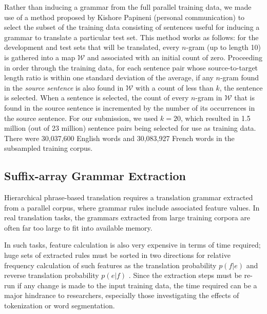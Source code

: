 \documentclass[11pt]{article}
\newcommand{\ignore}[1]{}
\begin{document}
Rather than inducing a grammar from the full parallel training data, we made use of a method proposed by Kishore Papineni (personal communication) to select the subset of the training data consisting of  sentences useful for inducing a grammar to translate a particular test set.  This method works as follows: for the development and test sets that will be translated, every $n$-gram (up to length 10) is gathered into a map $\mathcal{W}$ and associated with an initial count of zero.  Proceeding in order through the training data, for each sentence pair whose source-to-target length ratio is within one standard deviation of the average, if any $n$-gram found in the \emph{source sentence} is also found in $\mathcal{W}$ with a count of less than $k$, the sentence is selected.  When a sentence is selected, the count of every $n$-gram in $\mathcal{W}$ that is found in the source sentence is incremented by the number of its occurrences in the source sentence. \ignore{Thus, there are two conditions in which a sentence will not be selected: 1) it only contains $n$-grams that are not found in $\mathcal{W}$ (making it useless for learning in the highly lexicalized models we use) or 2) it only contains $n$-grams that have already been attested in the selected set $k$ or more times.} For our submission, we used $k=20$, which resulted in 1.5 million (out of 23 million) sentence pairs being selected for use as training data.  There were 30,037,600 English words and 30,083,927 French words in the subsampled training corpus. 

\subsection{Suffix-array Grammar Extraction}

Hierarchical phrase-based translation requires a translation grammar extracted from a parallel corpus, where grammar rules include associated feature values. In real translation tasks, the grammars extracted from large training corpora are often far too large to fit into available memory.

In such tasks, feature calculation is also very expensive in terms of time required; huge sets of extracted rules must be sorted in two directions for relative frequency calculation of such features as the translation probability $p(f|e)$ and reverse translation probability $p(e|f)$ \cite{Koehn2003}. Since the extraction steps must be re-run if any change is made to the input training data, the time required can be a major hindrance to researchers, especially those investigating the effects of tokenization or word segmentation.
\end{document}
